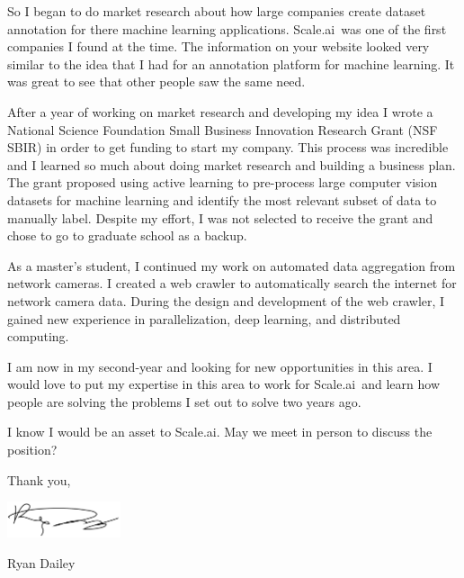 \documentclass[10pt]{article}
\newlength{\cvaftersectionskipamount}
\newcommand{\company}{Scale.ai}
\newcommand{\job}{Data Scientist}
\begin{document}
So I began to do market research about how large companies create dataset annotation for there machine learning applications. \company~was one of the first companies I found at the time. The information on your website looked very similar to the idea that I had for an annotation platform for machine learning. It was great to see that other people saw the same need. 

After a year of working on market research and developing my idea I wrote a National Science Foundation Small Business Innovation Research Grant (NSF SBIR) in order to get funding to start my company. This process was incredible and I learned so much about doing market research and building a business plan. The grant proposed using active learning to pre-process large computer vision datasets for machine learning and identify the most relevant subset of data to manually label. Despite my effort, I was not selected to receive the grant and chose to go to graduate school as a backup. 

As a master's student, I continued my work on automated data aggregation from network cameras. I created a web crawler to automatically search the internet for network camera data. During the design and development of the web crawler, I gained new experience in parallelization, deep learning, and distributed computing.

I am now in my second-year and looking for new opportunities in this area. I would love to put my expertise in this area to work for \company~and learn how people are solving the problems I set out to solve two years ago. 

\vspace{\cvaftersectionskipamount}

\noindent I know I would be an asset to \company. 
May we meet in person to discuss the position?  

\vspace{2\cvaftersectionskipamount}

\noindent Thank you, 

\vspace{\cvaftersectionskipamount}

\includegraphics[height=30pt]{Signature.pdf}

Ryan Dailey 
\end{document}
